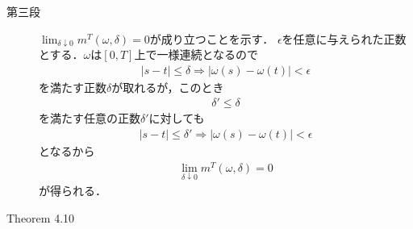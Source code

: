 \begin{sketch}
\begin{description}
			\item[第三段]
				$\lim_{\delta \downarrow 0}m^T(\omega,\delta) = 0$が成り立つことを示す．
				$\epsilon$を任意に与えられた正数とする．$\omega$は$[0,T]$上で一様連続となるので
				\begin{align}
					|s-t| \leq \delta \Longrightarrow |\omega(s) - \omega(t)| < \epsilon
				\end{align}
				を満たす正数$\delta$が取れるが，このとき
				\begin{align}
					\delta' \leq \delta
				\end{align}
				を満たす任意の正数$\delta'$に対しても
				\begin{align}
					|s-t| \leq \delta' \Longrightarrow |\omega(s) - \omega(t)| < \epsilon
				\end{align}
				となるから
				\begin{align}
					\lim_{\delta \downarrow 0}m^T(\omega,\delta) = 0
				\end{align}
				が得られる．
				\QED
		\end{description}
	\end{sketch}
	
	\begin{itembox}[l]{Theorem 4.10}
	\end{itembox}
	
